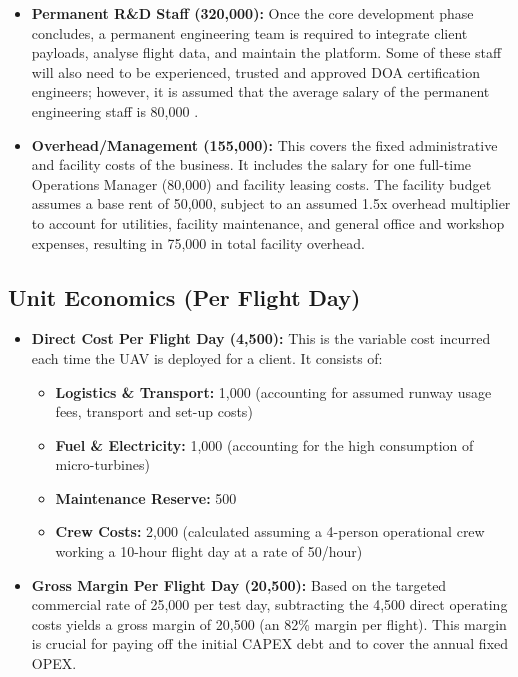 \begin{itemize}
    \item \textbf{Permanent R\&D Staff (\texteuro{}320,000):} Once the core development phase concludes, a permanent engineering team is required to integrate client payloads, analyse flight data, and maintain the platform. Some of these staff will also need to be experienced, trusted and approved DOA certification engineers; however, it is assumed that the average salary of the permanent engineering staff is \texteuro{}80,000 .

    \item \textbf{Overhead/Management (\texteuro{}155,000):} This covers the fixed administrative and facility costs of the business. It includes the salary for one full-time Operations Manager (\texteuro{}80,000)  and facility leasing costs. The facility budget assumes a base rent of \texteuro{}50,000, subject to an assumed 1.5x overhead multiplier to account for utilities, facility maintenance, and general office and workshop expenses, resulting in \texteuro{}75,000 in total facility overhead.
\end{itemize}

\subsection{Unit Economics (Per Flight Day)}

\begin{itemize}
    \item \textbf{Direct Cost Per Flight Day (\texteuro{}4,500):} This is the variable cost incurred each time the UAV is deployed for a client. It consists of:
    \begin{itemize}
        \item \textbf{Logistics \& Transport:} \texteuro{}1,000 (accounting for assumed runway usage fees, transport and set-up costs)
        \item \textbf{Fuel \& Electricity:} \texteuro{}1,000 (accounting for the high consumption of micro-turbines)
        \item \textbf{Maintenance Reserve:} \texteuro{}500
        \item \textbf{Crew Costs:} \texteuro{}2,000 (calculated assuming a 4-person operational crew working a 10-hour flight day at a rate of \texteuro{}50/hour)
    \end{itemize}

    \item \textbf{Gross Margin Per Flight Day (\texteuro{}20,500):} Based on the targeted commercial rate of \texteuro{}25,000 per test day, subtracting the \texteuro{}4,500 direct operating costs yields a gross margin of \texteuro{}20,500 (an 82\% margin per flight). This margin is crucial for paying off the initial CAPEX debt and to cover the annual fixed OPEX.
\end{itemize}

